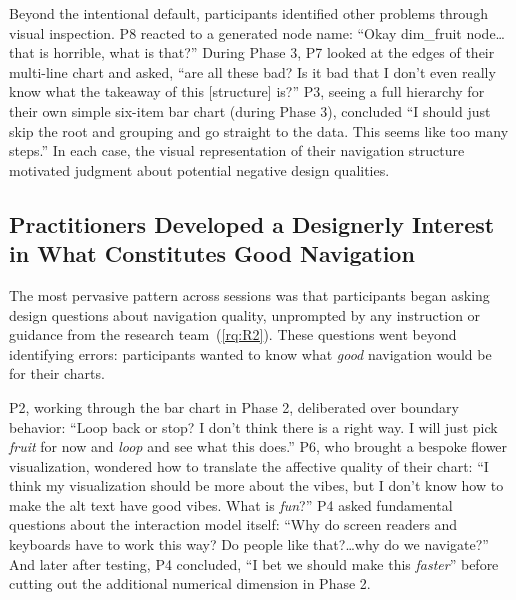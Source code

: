 \documentclass[12pt]{cmuthesis}
\begin{document}
Beyond the intentional default, participants identified other problems through visual inspection. P8 reacted to a generated node name: ``Okay dim\_fruit node\ldots that is horrible, what is that?'' During Phase 3, P7 looked at the edges of their multi-line chart and asked, ``are all these bad? Is it bad that I don't even really know what the takeaway of this [structure] is?'' P3, seeing a full hierarchy for their own simple six-item bar chart (during Phase 3), concluded ``I should just skip the root and grouping and go straight to the data. This seems like too many steps.'' In each case, the visual representation of their navigation structure motivated judgment about potential negative design qualities.

\subsection{Practitioners Developed a Designerly Interest in What Constitutes Good Navigation}
\label{sec:results-designerly}

The most pervasive pattern across sessions was that participants began asking design questions about navigation quality, unprompted by any instruction or guidance from the research team~(\ref{rq:R2}). These questions went beyond identifying errors: participants wanted to know what \textit{good} navigation would be for their charts.


P2, working through the bar chart in Phase 2, deliberated over boundary behavior: ``Loop back or stop? I don't think there is a right way. I will just pick \textit{fruit} for now and \textit{loop} and see what this does.'' P6, who brought a bespoke flower visualization, wondered how to translate the affective quality of their chart: ``I think my visualization should be more about the vibes, but I don't know how to make the alt text have good vibes. What is \textit{fun}?'' P4 asked fundamental questions about the interaction model itself: ``Why do screen readers and keyboards have to work this way? Do people like that?\ldots why do we navigate?'' And later after testing, P4 concluded, ``I bet we should make this \textit{faster}'' before cutting out the additional numerical dimension in Phase 2.

\end{document}
